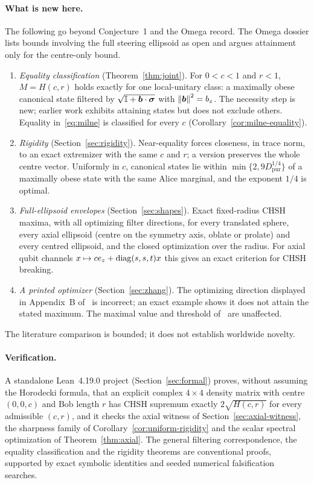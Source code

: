 \documentclass[11pt]{article}
\theoremstyle{remark}\newtheorem{remark}[theorem]{Remark}
\newcommand{\id}{\mathbb I}\newcommand{\ket}[1]{|#1\rangle}
\newcommand{\norm}[1]{\left\lVert#1\right\rVert}
\newcommand{\Dp}{D_{\mathrm{pur}}}
\begin{document}
\paragraph{What is new here.}
The following go beyond Conjecture~1 and the Omega record. The Omega dossier
lists bounds involving the full steering ellipsoid as open and argues
attainment only for the centre-only bound.
\begin{enumerate}
\item \emph{Equality classification} (Theorem~\ref{thm:joint}). For $0<c<1$
and $r<1$, $M=H(c,r)$ holds exactly for one local-unitary class: a maximally
obese canonical state filtered by $\sqrt{\id+\bv\cdot\bm\sigma}$ with
$\norm{\bv}^2=b_z$. The necessity step is new; earlier work exhibits
attaining states but does not exclude others. Equality in~\eqref{eq:milne} is
classified for every $c$ (Corollary~\ref{cor:milne-equality}).
\item \emph{Rigidity} (Section~\ref{sec:rigidity}). Near-equality forces
closeness, in trace norm, to an exact extremizer with the same $c$ and $r$;
a version preserves the whole centre vector. Uniformly in $c$, canonical
states lie within $\min\{2,9\Dp^{1/4}\}$ of a maximally obese state with the
same Alice marginal, and the exponent $1/4$ is optimal.
\item \emph{Full-ellipsoid envelopes} (Section~\ref{sec:shapes}). Exact
fixed-radius CHSH maxima, with all optimizing filter directions, for every
translated sphere, every axial ellipsoid (centre on the symmetry axis, oblate
or prolate) and every centred ellipsoid, and the closed optimization over the
radius. For axial qubit channels $x\mapsto ce_z+\operatorname{diag}(s,s,t)x$ this gives an
exact criterion for CHSH breaking.
\item \emph{A printed optimizer} (Section~\ref{sec:zhang}). The optimizing
direction displayed in Appendix~B of~\cite{zhang} is incorrect; an exact
example shows it does not attain the stated maximum. The maximal value and
threshold of~\cite{zhang} are unaffected.
\end{enumerate}
The literature comparison is bounded; it does not establish worldwide
novelty.

\paragraph{Verification.}
A standalone Lean~4.19.0 project (Section~\ref{sec:formal}) proves, without
assuming the Horodecki formula, that an explicit complex $4\times4$ density
matrix with centre $(0,0,c)$ and Bob length $r$ has CHSH supremum exactly
$2\sqrt{H(c,r)}$ for every admissible $(c,r)$, and it checks the axial witness
of Section~\ref{sec:axial-witness}, the sharpness family of
Corollary~\ref{cor:uniform-rigidity} and the scalar spectral optimization of
Theorem~\ref{thm:axial}. The general filtering correspondence, the equality
classification and the rigidity theorems are conventional proofs, supported
by exact symbolic identities and seeded numerical falsification searches.
\end{document}
